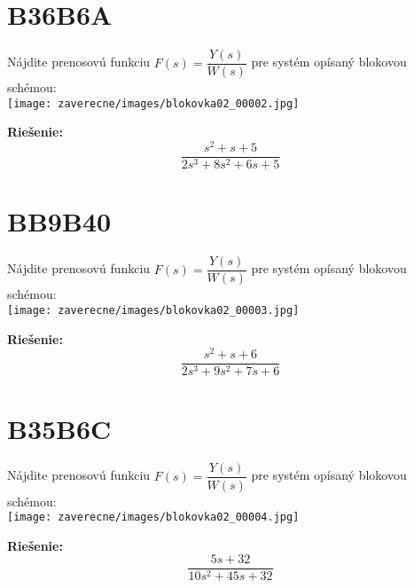 \documentclass[a4paper, 12pt]{article}
\newenvironment{task}{}{}
\newenvironment{solution}{\noindent\textbf{Riešenie:}}{}
\begin{document}
\section*{B36B6A}
\begin{task}
    Nájdite prenosovú funkciu $F(s)=\dfrac{Y(s)}{W(s)}$ pre systém opísaný blokovou schémou: \\ 

    \texttt{[image: zaverecne/images/blokovka02\_00002.jpg]}
\end{task} 

\begin{solution}
    \begin{equation*}
        \dfrac{s^2+s+5}{2s^3+8s^2+6s+5}
    \end{equation*}
\end{solution}

\section*{BB9B40}
\begin{task}
    Nájdite prenosovú funkciu $F(s)=\dfrac{Y(s)}{W(s)}$ pre systém opísaný blokovou schémou: \\ 

    \texttt{[image: zaverecne/images/blokovka02\_00003.jpg]}
\end{task} 

\begin{solution}
    \begin{equation*}
        \dfrac{s^2+s+6}{2s^3+9s^2+7s+6}
    \end{equation*}
\end{solution}
\section*{B35B6C}
\begin{task}
    Nájdite prenosovú funkciu $F(s)=\dfrac{Y(s)}{W(s)}$ pre systém opísaný blokovou schémou: \\ 

    \texttt{[image: zaverecne/images/blokovka02\_00004.jpg]}
\end{task} 

\begin{solution}
    \begin{equation*}
        \dfrac{5s+32}{10s^2+45s+32}
    \end{equation*}
\end{solution}
\end{document}
